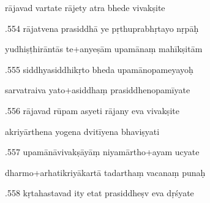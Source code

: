 \documentclass[article,12pt,a4paper]{memoir}%
\newcounter{parCount}
\begin{document}
	  
	  \pstart \leavevmode%
	rājavad vartate rājety atra bhede vivakṣite 
	{}
	\pend%
      

	  
	  \pstart {}.554 rājatvena prasiddhā ye pṛthuprabhṛtayo nṛpāḥ 
	{}
	\pend%
      

	  
	  \pstart \leavevmode%
	yudhiṣṭhirāntās te+anyeṣām upamānaṃ mahīkṣitām 
	{}
	\pend%
      

	  
	  \pstart {}.555 siddhyasiddhikṛto bheda upamānopameyayoḥ 
	{}
	\pend%
      

	  
	  \pstart \leavevmode%
	sarvatraiva yato+asiddhaṃ prasiddhenopamīyate 
	{}
	\pend%
      

	  
	  \pstart {}.556 rājavad rūpam asyeti rājany eva vivakṣite 
	{}
	\pend%
      

	  
	  \pstart \leavevmode%
	akriyārthena yogena dvitīyena bhaviṣyati 
	{}
	\pend%
      

	  
	  \pstart {}.557 upamānāvivakṣāyāṃ niyamārtho+ayam ucyate 
	{}
	\pend%
      

	  
	  \pstart \leavevmode%
	dharmo+arhatikriyākartā tadarthaṃ vacanaṃ punaḥ 
	{}
	\pend%
      

	  
	  \pstart {}.558 kṛtahastavad ity etat prasiddheṣv eva dṛśyate 
	{}
	\pend%
      
\end{document}
